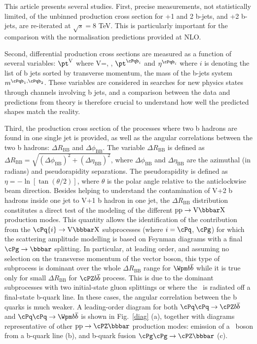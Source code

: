 {This article presents several studies. First, precise measurements,
not statistically limited, of the unbinned production cross section
for \cPZ+1 and 2 b-jets, and \Wpm+2 b-jets, are re-iterated at
$\sqrt{s}=8$ TeV. This is particularly important for the comparison
with the normalisation predictions provided at NLO.

Second, differential production cross sections are measured as a
function of several variables: $\pt^{\rm V}$ where V=\cPZ, \Wpm,
$\pt^{\cPqb_i}$ and $\eta^{\cPqb_i}$ where $i$ is denoting the list of
b jets sorted by transverse momentum, the mass of the b-jets system
$m^{\cPqb_1,\cPqb_2}$. These variables are considered in searches for
new physics states through channels involving b jets, and a comparison
between the data and predictions from theory is therefore crucial to
understand how well the predicted shapes match the reality.

Third, the production cross section of the processes where two b
hadrons are found in one single jet is provided, as well as the
angular correlations between the two b hadrons: $\Delta
R_{\mathrm{BB}}$ and $\Delta\phi_{\mathrm{BB}}$. The variable $\Delta
R_{\mathrm{BB}}$ is defined as $\Delta R_{\mathrm{BB}} = \sqrt{
  (\Delta \phi_{\mathrm{BB}})^2 + (\Delta \eta_{\mathrm{BB}})^2}$,
where $\Delta \phi_{\mathrm{BB}}$ and $\Delta \eta_{\mathrm{BB}}$ are
the azimuthal (in radians) and pseudorapidity separations. The
pseudorapidity is defined as $\eta= -\ln[\tan(\theta/2)]$, where
$\theta$ is the polar angle relative to the anticlockwise beam
direction. Besides helping to understand the contamination of V+2 b
hadrons inside one jet to V+1 b hadron in one jet, the $\Delta
R_{\mathrm{BB}}$ distribution constitutes a direct test of the
modeling of the different $\mathrm{pp}\rightarrow {\rm V}
\bbbar\mathrm{X}$ production modes. This quantity allows the
identification of the contribution from the $\cPq{i} \rightarrow {\rm
  V} \bbbar \mathrm{X}$ subprocesses (where $i=\cPq$, $\cPg$) for
which the scattering amplitude modelling is based on Feynman diagrams
with a final $\cPg \rightarrow \bbbar$ splitting. In particular, at
leading order, and assuming no selection on the transverse momentum of
the vector boson, this type of subprocess is dominant over the whole
$\Delta R_{\mathrm{BB}}$ range for $\Wpm b\overline{b}$ while it is
true only for small $\Delta R_{\mathrm{BB}}$ for $\cPZ b\overline{b}$
process. This is due to the dominant subprocesses with two
initial-state gluon splittings or where the \cPZ\ is radiated off a
final-state b-quark line. In these cases, the angular correlation
between the b quarks is much weaker. A leading-order diagram for both
$\cPq\cPq\rightarrow \cPZ b\overline{b}$ and $\cPq\cPq\rightarrow \Wpm
b\overline{b}$ is shown in Fig.~\ref{diag} (a), together with
diagrams representative of other $\mathrm{pp}\rightarrow\cPZ\bbbar$
production modes: emission of a \cPZ~boson from a b-quark line (b),
and b-quark fusion $\cPg\cPg \rightarrow \cPZ\bbbar$ (c).

}
